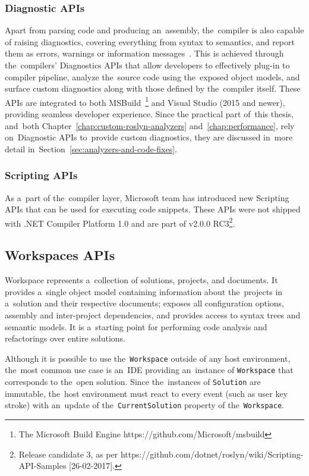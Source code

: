 \documentclass[
  digital, %
  table,   %
  lof,     %
  lot,     %
  oneside,
]{fithesis3}
\begin{document}
\subsubsection{Diagnostic APIs}
Apart from parsing code and producing an~assembly, the~compiler is also capable of raising diagnostics, covering everything from syntax to semantics, and report them as errors, warnings or information messages~\cite{roslyn-succinctly}. This is achieved through the~compilers' Diagnostics APIs that allow developers to effectively plug-in to compiler pipeline, analyze the~source code using the~exposed object models, and surface custom diagnostics along with those defined by the~compiler itself. These APIs are integrated to both MSBuild~\footnote{The Microsoft Build Engine https://github.com/Microsoft/msbuild} and Visual Studio (2015 and newer), providing seamless developer experience. Since the practical part of~this thesis, and~both Chapter~\ref{chap:custom-roslyn-analyzers} and~\ref{chap:performance}, rely on~Diagnostic APIs to~provide custom diagnostics, they are discussed in~more detail in~Section~\ref{sec:analyzers-and-code-fixes}.

\subsubsection{Scripting APIs}
As a~part of the~compiler layer, Microsoft team has introduced new Scripting APIs that can be used for executing code snippets. These APIs were not shipped with .NET Compiler Platform 1.0 and are part of v2.0.0 RC3\footnote{Release candidate 3, as per https://github.com/dotnet/roslyn/wiki/Scripting-API-Samples [26-02-2017].}.

\subsection{Workspaces APIs}
Workspace represents a~collection of solutions, projects, and documents. It provides a~single object model containing information about the~projects in a~solution and their respective documents; exposes all configuration options, assembly and inter-project dependencies, and provides access to syntax trees and semantic models. It is a~starting point for performing code analysis and refactorings over entire solutions.

Although it is possible to use the~\texttt{Workspace} outside of any host environment, the~most common use case is an~IDE providing an~instance of \texttt{Workspace} that corresponds to the~open solution. Since the~instances of \texttt{Solution} are immutable, the~host environment must react to every event (such as user key stroke) with an~update of the~\texttt{CurrentSolution} property of the~\texttt{Workspace}.
\end{document}
